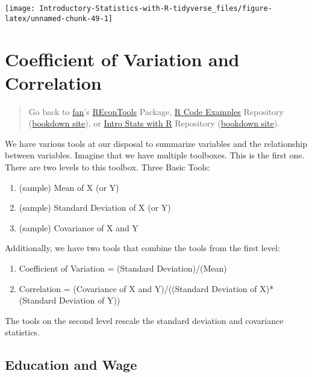 \documentclass[
]{book}
\providecommand{\tightlist}{%
  \setlength{\itemsep}{0pt}\setlength{\parskip}{0pt}}
\begin{document}
\begin{center}\texttt{[image: Introductory-Statistics-with-R-tidyverse\_files/figure-latex/unnamed-chunk-49-1]} \end{center}

\hypertarget{coefficient-of-variation-and-correlation}{%
\section{Coefficient of Variation and Correlation}\label{coefficient-of-variation-and-correlation}}

\begin{quote}
Go back to \href{http://fanwangecon.github.io/}{fan}'s \href{https://fanwangecon.github.io/REconTools/}{REconTools} Package, \href{https://fanwangecon.github.io/R4Econ/}{R Code Examples} Repository (\href{https://fanwangecon.github.io/R4Econ/bookdown}{bookdown site}), or \href{https://fanwangecon.github.io/Stat4Econ/}{Intro Stats with R} Repository (\href{https://fanwangecon.github.io/Stat4Econ/bookdown}{bookdown site}).
\end{quote}

We have various tools at our disposal to summarize variables and the relationship between variables. Imagine that we have multiple toolboxes. This is the first one. There are two levels to this toolbox. Three Basic Tools:

\begin{enumerate}
\def\labelenumi{\arabic{enumi}.}
\tightlist
\item
  (sample) Mean of X (or Y)
\item
  (sample) Standard Deviation of X (or Y)
\item
  (sample) Covariance of X and Y
\end{enumerate}

Additionally, we have two tools that combine the tools from the first level:

\begin{enumerate}
\def\labelenumi{\arabic{enumi}.}
\tightlist
\item
  Coefficient of Variation = (Standard Deviation)/(Mean)
\item
  Correlation = (Covariance of X and Y)/((Standard Deviation of X)*(Standard Deviation of Y))
\end{enumerate}

The tools on the second level rescale the standard deviation and covariance statistics.

\hypertarget{education-and-wage}{%
\subsection{Education and Wage}\label{education-and-wage}}
\end{document}
